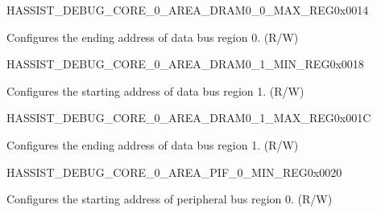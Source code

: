 \begin{register}{H}{ASSIST\_DEBUG\_CORE\_0\_AREA\_DRAM0\_0\_MAX\_REG}{0x0014}\label{regdesc:ASSISTDEBUGCORE0AREADRAM00MAXREG}
%
\regnewline%
\begin{regdesc}\begin{reglist}
\label{fielddesc:ASSISTDEBUGCORE0AREADRAM00MAX}\item [ASSIST\_DEBUG\_CORE\_0\_AREA\_DRAM0\_0\_MAX] Configures the ending address of data bus region 0. (R/W)
\end{reglist}\end{regdesc}
\end{register}


\begin{register}{H}{ASSIST\_DEBUG\_CORE\_0\_AREA\_DRAM0\_1\_MIN\_REG}{0x0018}\label{regdesc:ASSISTDEBUGCORE0AREADRAM01MINREG}
%
\regnewline%
\begin{regdesc}\begin{reglist}
\label{fielddesc:ASSISTDEBUGCORE0AREADRAM01MIN}\item [ASSIST\_DEBUG\_CORE\_0\_AREA\_DRAM0\_1\_MIN] Configures the starting address of data bus region 1. (R/W)
\end{reglist}\end{regdesc}
\end{register}


\begin{register}{H}{ASSIST\_DEBUG\_CORE\_0\_AREA\_DRAM0\_1\_MAX\_REG}{0x001C}\label{regdesc:ASSISTDEBUGCORE0AREADRAM01MAXREG}
%
\regnewline%
\begin{regdesc}\begin{reglist}
\label{fielddesc:ASSISTDEBUGCORE0AREADRAM01MAX}\item [ASSIST\_DEBUG\_CORE\_0\_AREA\_DRAM0\_1\_MAX] Configures the ending address of data bus region 1. (R/W)
\end{reglist}\end{regdesc}
\end{register}


\begin{register}{H}{ASSIST\_DEBUG\_CORE\_0\_AREA\_PIF\_0\_MIN\_REG}{0x0020}\label{regdesc:ASSISTDEBUGCORE0AREAPIF0MINREG}
%
\regnewline%
\begin{regdesc}\begin{reglist}
\label{fielddesc:ASSISTDEBUGCORE0AREAPIF0MIN}\item [ASSIST\_DEBUG\_CORE\_0\_AREA\_PIF\_0\_MIN] Configures the starting address of peripheral bus region 0. (R/W)
\end{reglist}\end{regdesc}
\end{register}


